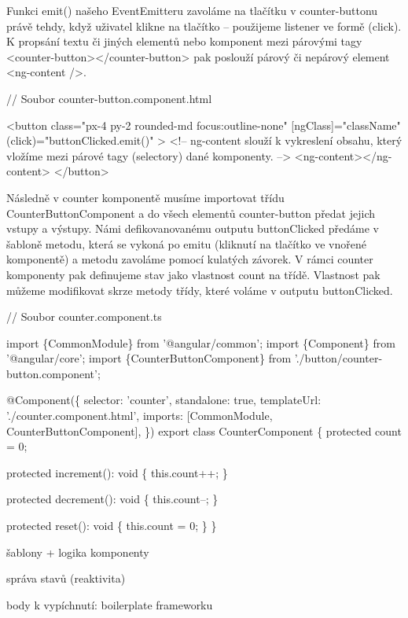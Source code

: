 Funkci emit() našeho EventEmitteru zavoláme na tlačítku v counter-buttonu právě tehdy, když uživatel klikne na tlačítko -- použijeme listener ve formě (click). 
K propsání textu či jiných elementů nebo komponent mezi párovými tagy <counter-button></counter-button> pak poslouží párový či nepárový element <ng-content />.

\begin{prog}
// Soubor counter-button.component.html

<button
  class="px-4 py-2 rounded-md focus:outline-none"
  [ngClass]="className"
  (click)="buttonClicked.emit()"
>
  <!-- ng-content slouží k vykreslení obsahu, který vložíme
   mezi párové tagy (selectory) dané komponenty. -->
  <ng-content></ng-content>
</button>
\end{prog}

Následně v counter komponentě musíme importovat třídu CounterButtonComponent a do všech elementů counter-button předat jejich vstupy a výstupy. 
Námi defikovanovanému outputu buttonClicked předáme v šabloně metodu, která se vykoná po emitu (kliknutí na tlačítko ve vnořené komponentě) a metodu zavoláme pomocí kulatých závorek. 
V rámci counter komponenty pak definujeme stav jako vlastnost count na třídě. Vlastnost pak můžeme modifikovat skrze metody třídy, které voláme v outputu buttonClicked.

\begin{prog}
// Soubor counter.component.ts

import \{CommonModule\} from '@angular/common';
import \{Component\} from '@angular/core';
import \{CounterButtonComponent\} from './button/counter-button.component';

@Component(\{
  selector: 'counter',
  standalone: true,
  templateUrl: './counter.component.html',
  imports: [CommonModule, CounterButtonComponent],
\})
export class CounterComponent \{
  protected count = 0;

  protected increment(): void \{
    this.count++;
  \}

  protected decrement(): void \{
    this.count--;
  \}

  protected reset(): void \{
    this.count = 0;
  \}
\}
\end{prog}

\begin{citemize}
	\item šablony + logika komponenty
	\item správa stavů (reaktivita)
	\item body k vypíchnutí: boilerplate frameworku
\end{citemize}

